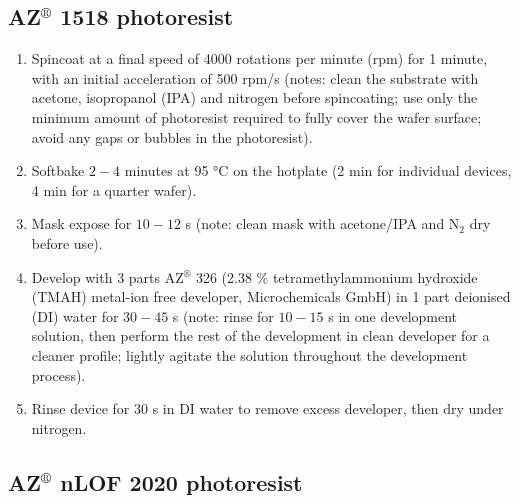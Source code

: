 \documentclass[
  a4paper,
]{scrbook}
\begin{document}
\hypertarget{azcircledr-1518-photoresist}{%
\subsection{\texorpdfstring{AZ\(^\circledR\) 1518
photoresist}{AZ\^{}\textbackslash circledR 1518 photoresist}}\label{azcircledr-1518-photoresist}}

\begin{enumerate}
\def\labelenumi{\arabic{enumi}.}
\item
  Spincoat at a final speed of 4000 rotations per minute (rpm) for 1
  minute, with an initial acceleration of 500 rpm/s (notes: clean the
  substrate with acetone, isopropanol (IPA) and nitrogen before
  spincoating; use only the minimum amount of photoresist required to
  fully cover the wafer surface; avoid any gaps or bubbles in the
  photoresist).
\item
  Softbake \(2-4\) minutes at 95 °C on the hotplate (2 min for
  individual devices, 4 min for a quarter wafer).
\item
  Mask expose for \(10-12\) s (note: clean mask with acetone/IPA and
  N\(_2\) dry before use).
\item
  Develop with 3 parts AZ\(^\circledR\) 326 (2.38 \% tetramethylammonium
  hydroxide (TMAH) metal-ion free developer, Microchemicals GmbH) in 1
  part deionised (DI) water for \(30-45\) s (note: rinse for \(10-15\) s
  in one development solution, then perform the rest of the development
  in clean developer for a cleaner profile; lightly agitate the solution
  throughout the development process).
\item
  Rinse device for 30 s in DI water to remove excess developer, then dry
  under nitrogen.
\end{enumerate}

\hypertarget{azcircledr-nlof-2020-photoresist}{%
\subsection{\texorpdfstring{AZ\(^\circledR\) nLOF 2020
photoresist}{AZ\^{}\textbackslash circledR nLOF 2020 photoresist}}\label{azcircledr-nlof-2020-photoresist}}
\end{document}
